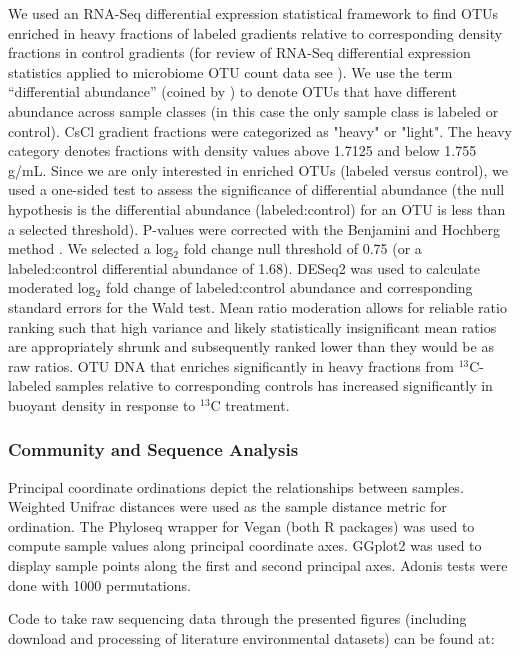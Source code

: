 \documentclass{article}
\begin{document}
We used an RNA-Seq differential expression statistical framework
\citep{Love_2014} to find OTUs enriched in heavy fractions of labeled
gradients relative to corresponding density fractions in control gradients
(for review of RNA-Seq differential expression statistics applied to
microbiome OTU count data see \citet{McMurdie_2014}). We use the term
“differential abundance” (coined by \citet{McMurdie_2014}) to denote OTUs that
have different abundance across sample classes (in this case the only sample
class is labeled or control). CsCl gradient fractions were categorized as
"heavy" or "light". The heavy category denotes fractions with density values
above 1.7125 and below 1.755 g/mL. Since we are only interested in enriched
OTUs (labeled versus control), we used a one-sided test to assess the
significance of differential abundance (the null hypothesis is the differential
abundance (labeled:control) for an OTU is less than a selected threshold).
P-values were corrected with the Benjamini and Hochberg method
\citep{Benjamini_1997}. We selected a log$_{2}$ fold change null threshold of
0.75 (or a labeled:control differential abundance of 1.68). DESeq2 was used to
calculate moderated log$_{2}$ fold change of labeled:control abundance and
corresponding standard errors for the Wald test. Mean ratio moderation allows
for reliable ratio ranking such that high variance and likely statistically
insignificant mean ratios are appropriately shrunk and subsequently ranked
lower than they would be as raw ratios. OTU DNA that enriches significantly in
heavy fractions from $^{13}$C-labeled samples relative to corresponding
controls has increased significantly in buoyant density in response to $^{13}$C
treatment.

\subsubsection{Community and Sequence Analysis}
Principal coordinate ordinations depict the relationships between
samples. Weighted Unifrac \citep{Lozupone_2005} distances were
used as the sample distance metric for ordination. The Phyloseq
\citep{McMurdie_2013} wrapper for Vegan \citep{Dixon_2003} (both R packages) was
used to compute sample values along principal coordinate axes. GGplot2
\citep{Wickham_2009} was used to display sample points along the first and
second principal axes. Adonis tests \citep{Anderson_2001} were done with 1000
permutations.

Code to take raw sequencing data through the presented figures (including
download and processing of literature environmental datasets) can be
found at:
\end{document}
